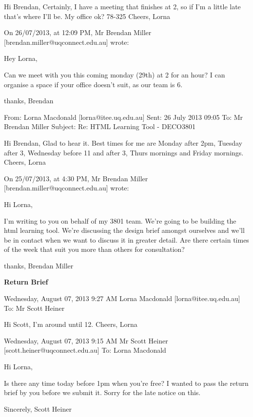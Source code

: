 \documentclass[12pt]{article}
\begin{document}
Hi Brendan,
Certainly, I have a meeting that finishes at 2, so if I'm a little late that's where I'll be. My office ok? 78-325
Cheers,
Lorna

On 26/07/2013, at 12:09 PM, Mr Brendan Miller [brendan.miller@uqconnect.edu.au]
 wrote:

Hey Lorna,

Can we meet with you this coming monday (29th) at 2 for an hour?
I can organise a space if your office doesn't suit, as our team is 6.

thanks,
Brendan

From: Lorna Macdonald [lorna@itee.uq.edu.au]
Sent: 26 July 2013 09:05
To: Mr Brendan Miller
Subject: Re: HTML Learning Tool - DECO3801
 
Hi Brendan,
Glad to hear it. Best times for me are Monday after 2pm, Tuesday after 3, Wednesday before 11 and after 3, Thurs mornings and Friday mornings.
Cheers,
Lorna

On 25/07/2013, at 4:30 PM, Mr Brendan Miller [brendan.miller@uqconnect.edu.au]
 wrote:

Hi Lorna,

I'm writing to you on behalf of my 3801 team. We're going to be building the html
learning tool. We're discussing the design brief amongst ourselves and we'll be in
contact when we want to discuss it in greater detail. Are there certain times of the
week that suit you more than others for consultation?

thanks,
Brendan Miller


{\bf Return Brief}

Wednesday, August 07, 2013 9:27 AM
Lorna Macdonald [lorna@itee.uq.edu.au]
To:
 Mr Scott Heiner 

Hi Scott, 
I'm around until 12. 
Cheers,
Lorna


Wednesday, August 07, 2013 9:15 AM
Mr Scott Heiner [scott.heiner@uqconnect.edu.au]
To:
 Lorna Macdonald

Hi Lorna,

Is there any time today before 1pm when you're free? I wanted to pass the return brief by you before we submit it. Sorry for the late notice on this.

Sincerely,
Scott Heiner
\end{document}
